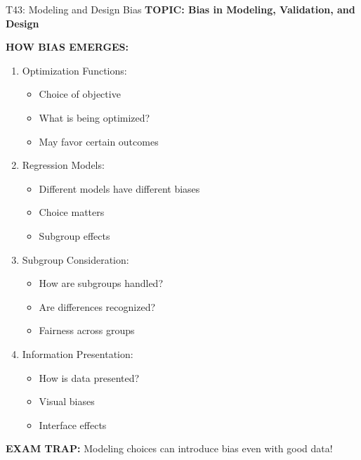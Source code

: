 \documentclass[8pt]{beamer}
\begin{document}
	\begin{frame}{T43: Modeling and Design Bias}
		\fontsize{6.5}{7.5}\selectfont
		\textbf{TOPIC: Bias in Modeling, Validation, and Design}
		
		\vspace{0.1cm}
		\textbf{HOW BIAS EMERGES:}
		\begin{enumerate}
			\item \textcolor{myblue}{Optimization Functions:}
			\begin{itemize}
				\item Choice of objective
				\item What is being optimized?
				\item May favor certain outcomes
			\end{itemize}
			\item \textcolor{myblue}{Regression Models:}
			\begin{itemize}
				\item Different models have different biases
				\item Choice matters
				\item Subgroup effects
			\end{itemize}
			\item \textcolor{myblue}{Subgroup Consideration:}
			\begin{itemize}
				\item How are subgroups handled?
				\item Are differences recognized?
				\item Fairness across groups
			\end{itemize}
			\item \textcolor{myblue}{Information Presentation:}
			\begin{itemize}
				\item How is data presented?
				\item Visual biases
				\item Interface effects
			\end{itemize}
		\end{enumerate}
		
		\textcolor{myred}{\textbf{EXAM TRAP:}} Modeling choices can \textcolor{myblue}{introduce bias} even with good data!
	\end{frame}
	
\end{document}
